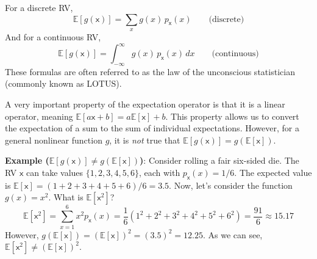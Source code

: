 For a discrete RV,
\begin{equation}
\mathbb{E}[g(\mathsf{x})] = \sum_{x} g(x) \, p_{\mathsf{x}}(x) \qquad\text{(discrete)}
\end{equation}
And for a continuous RV,
\begin{equation}
\mathbb{E}[g(\mathsf{x})] = \int_{-\infty}^{\infty} g(x) \, p_{\mathsf{x}}(x)\,dx \qquad\text{(continuous)}
\end{equation}
These formulas are often referred to as the law of the unconscious statistician (commonly known as LOTUS). 

A very important property of the expectation operator is that it is a linear operator, meaning $\mathbb{E}[a\mathsf{x} + b] = a\mathbb{E}[\mathsf{x}] + b$. This property allows us to convert the expectation of a sum to the sum of individual expectations. However, for a general nonlinear function $g$, it is \emph{not} true that $\mathbb{E}[g(\mathsf{x})] = g(\mathbb{E}[\mathsf{x}])$.

\begin{exampleBox}
    \textbf{Example ($\mathbb{E}[g(\mathsf{x})] \neq g(\mathbb{E}[\mathsf{x}])$)}: Consider rolling a fair six-sided die. The RV $\mathsf{x}$ can take values $\{1, 2, 3, 4, 5, 6\}$, each with $p_{\mathsf{x}}(x)=1/6$. The expected value is $\mathbb{E}[\mathsf{x}] = (1+2+3+4+5+6)/6 = 3.5$.
    Now, let's consider the function $g(x) = x^2$. What is $\mathbb{E}[\mathsf{x}^2]$?
    $$ \mathbb{E}[\mathsf{x}^2] = \sum_{x=1}^{6} x^2 p_{\mathsf{x}}(x) = \frac{1}{6}(1^2 + 2^2 + 3^2 + 4^2 + 5^2 + 6^2) = \frac{91}{6} \approx 15.17 $$
    However, $g(\mathbb{E}[\mathsf{x}]) = (\mathbb{E}[\mathsf{x}])^2 = (3.5)^2 = 12.25$. As we can see, $\mathbb{E}[\mathsf{x}^2] \neq (\mathbb{E}[\mathsf{x}])^2$.
\end{exampleBox}

